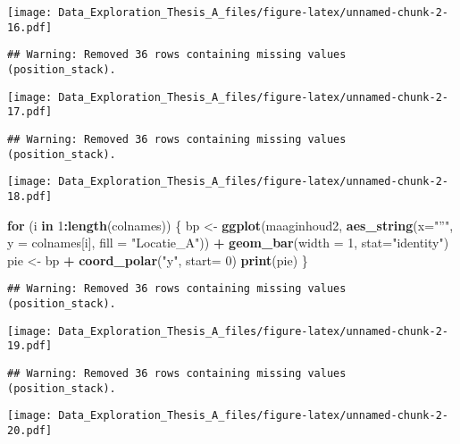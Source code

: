 \documentclass[]{article}
\newenvironment{Shaded}{\begin{snugshade}}{\end{snugshade}}
\newcommand{\KeywordTok}[1]{\textcolor[rgb]{0.13,0.29,0.53}{\textbf{#1}}}
\newcommand{\DataTypeTok}[1]{\textcolor[rgb]{0.13,0.29,0.53}{#1}}
\newcommand{\DecValTok}[1]{\textcolor[rgb]{0.00,0.00,0.81}{#1}}
\newcommand{\StringTok}[1]{\textcolor[rgb]{0.31,0.60,0.02}{#1}}
\newcommand{\ControlFlowTok}[1]{\textcolor[rgb]{0.13,0.29,0.53}{\textbf{#1}}}
\newcommand{\OperatorTok}[1]{\textcolor[rgb]{0.81,0.36,0.00}{\textbf{#1}}}
\newcommand{\NormalTok}[1]{#1}
\begin{document}
\texttt{[image: Data\_Exploration\_Thesis\_A\_files/figure-latex/unnamed-chunk-2-16.pdf]}

\begin{verbatim}
## Warning: Removed 36 rows containing missing values (position_stack).
\end{verbatim}

\texttt{[image: Data\_Exploration\_Thesis\_A\_files/figure-latex/unnamed-chunk-2-17.pdf]}

\begin{verbatim}
## Warning: Removed 36 rows containing missing values (position_stack).
\end{verbatim}

\texttt{[image: Data\_Exploration\_Thesis\_A\_files/figure-latex/unnamed-chunk-2-18.pdf]}

\begin{Shaded}
\begin{Highlighting}[]
\ControlFlowTok{for}\NormalTok{ (i }\ControlFlowTok{in} \DecValTok{1}\OperatorTok{:}\KeywordTok{length}\NormalTok{(colnames)) \{}
\NormalTok{  bp <-}\StringTok{ }\KeywordTok{ggplot}\NormalTok{(maaginhoud2, }\KeywordTok{aes_string}\NormalTok{(}\DataTypeTok{x=}\StringTok{"''"}\NormalTok{, }\DataTypeTok{y =}\NormalTok{ colnames[i], }\DataTypeTok{fill =} \StringTok{"Locatie_A"}\NormalTok{)) }\OperatorTok{+}
\StringTok{    }\KeywordTok{geom_bar}\NormalTok{(}\DataTypeTok{width =} \DecValTok{1}\NormalTok{, }\DataTypeTok{stat=}\StringTok{"identity"}\NormalTok{)}
\NormalTok{  pie <-}\StringTok{ }\NormalTok{bp }\OperatorTok{+}\StringTok{ }\KeywordTok{coord_polar}\NormalTok{(}\StringTok{"y"}\NormalTok{, }\DataTypeTok{start=} \DecValTok{0}\NormalTok{)}
  \KeywordTok{print}\NormalTok{(pie)}
\NormalTok{\}}
\end{Highlighting}
\end{Shaded}

\begin{verbatim}
## Warning: Removed 36 rows containing missing values (position_stack).
\end{verbatim}

\texttt{[image: Data\_Exploration\_Thesis\_A\_files/figure-latex/unnamed-chunk-2-19.pdf]}

\begin{verbatim}
## Warning: Removed 36 rows containing missing values (position_stack).
\end{verbatim}

\texttt{[image: Data\_Exploration\_Thesis\_A\_files/figure-latex/unnamed-chunk-2-20.pdf]}
\end{document}
